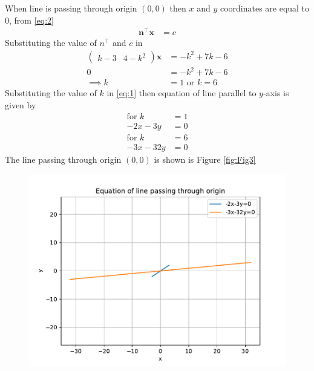 \documentclass[12pt]{article}
\newcommand{\myvec}[1]{\ensuremath{\begin{pmatrix}#1\end{pmatrix}}}
\let\vec\mathbf
\begin{document}
\begin{enumerate}
\begin{enumerate}
When line is passing through origin $(0,0)$ then $x$ and $y$ coordinates are equal to $0$, from \eqref{eq:2}
\begin{align}
        \vec{n}^{\top}\vec{x} &=c        
\end{align}
Substituting the value of $n^\top$ and $c$ in
\begin{align}
    \myvec{k-3 & 4-k^2}\vec{x} &= -k^2+7k-6\\
    0 &=-k^2+7k-6\\
   \implies k &=1 \text{ or } k=6
\end{align}
Substituting the value of $k$ in \eqref{eq:1} then equation of line parallel to $y$-axis is given by
\begin{align}
\text{for } k &=1\\
        -2x-3y &=0\\
\text{for } k &=6\\
        -3x-32y &=0
\end{align}
The line passing through origin $(0,0)$ is shown is Figure \eqref{fig:Fig3}

\begin{figure}[!h]
\begin{center}
\includegraphics[width=\columnwidth]{figs/fig3.pdf}
\end{center}
\caption{}
\label{fig:Fig3}
\end{figure}
\end{enumerate}
\end{enumerate}
\end{document}
